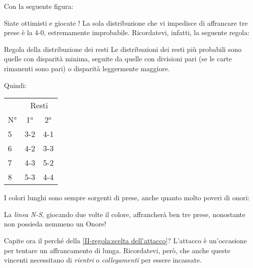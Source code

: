 \documentclass[../corsofiori.tex]{subfiles}
\begin{document}
Con la seguente figura:


Siate ottimisti e giocate ! La sola distribuzione che vi impedisce di affrancare tre prese è la 4-0,
estremamente improbabile. Ricordatevi, infatti, la seguente regola:

\medskip

\begin{regola}{Regola della distribuzione dei resti}
    Le distribuzioni dei resti più probabili sono quelle con disparità minima, seguite da quelle con divisioni pari (se
    le carte rimanenti sono pari) o disparità leggermente maggiore.
\end{regola}
\medskip

    Quindi:
    \begin{center}
    \begin{tabular}{lcc}
        \toprule
        & \multicolumn{2}{c}{Resti}\\
        \cmidrule(l){2-3}
        N°& 1$^a$ & 2$^a$ \\
        \midrule
        5 & 3-2 & 4-1\\
        6 & 4-2 & 3-3\\
        7 & 4-3 & 5-2\\
        8 & 5-3 & 4-4\\
    \end{tabular}


    \end{center}

\medskip

I colori lunghi sono sempre sorgenti di prese, anche quanto molto poveri di onori:

\begin{wraptable}[6]{l}[0cm]{3cm}


\end{wraptable}

La \emph{linea N-S}, giocando due volte il colore,
affrancherà ben tre prese, nonostante non possieda nemmeno un Onore!

Capite ora il perché della \autoref{II-regola:scelta dell'attacco}? L'attacco è un'occasione per tentare un affrancamento di lunga.
Ricordatevi, però, che anche queste vincenti necessitano di \emph{rientri} o \emph{collegamenti} per essere incassate.
\end{document}
